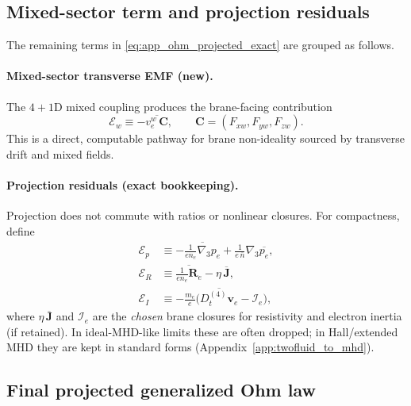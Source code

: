 \documentclass[11pt]{article}
\begin{document}
\subsection{Mixed-sector term and projection residuals}
\label{app:ohm_mixed_and_residuals}

The remaining terms in \eqref{eq:app_ohm_projected_exact} are grouped as follows.

\paragraph{Mixed-sector transverse EMF (new).}
The \(4+1\)D mixed coupling produces the brane-facing contribution
\begin{equation}
\boldsymbol{\mathcal{E}}_{w}
\equiv
-\overline{v_e^w\,\mathbf{C}},
\qquad \mathbf{C}=(F_{xw},F_{yw},F_{zw}).
\label{eq:app_Ew_def}
\end{equation}
This is a direct, computable pathway for brane non-ideality sourced by transverse drift and mixed fields.

\paragraph{Projection residuals (exact bookkeeping).}
Projection does not commute with ratios or nonlinear closures. For compactness, define
\begin{align}
\boldsymbol{\mathcal{E}}_{p}
&\equiv
-\overline{\frac{1}{e n_e}\nabla_3 p_e}
+\frac{1}{e\,\overline{n}}\nabla_3\overline{p_e},
\label{eq:app_Ep_def}
\\
\boldsymbol{\mathcal{E}}_{R}
&\equiv
\overline{\frac{1}{e n_e}\mathbf{R}_e}-\eta\,\overline{\mathbf{J}},
\label{eq:app_ER_def}
\\
\boldsymbol{\mathcal{E}}_{I}
&\equiv
-\frac{m_e}{e}\Big(\overline{D_t^{(4)}\mathbf{v}_e}-\mathcal{I}_e\Big),
\label{eq:app_EI_def}
\end{align}
where \(\eta\,\overline{\mathbf{J}}\) and \(\mathcal{I}_e\) are the \emph{chosen} brane closures for resistivity
and electron inertia (if retained). In ideal-MHD-like limits these are often dropped; in Hall/extended MHD
they are kept in standard forms (Appendix~\ref{app:twofluid_to_mhd}).

\subsection{Final projected generalized Ohm law}
\label{app:ohm_final}
\end{document}

